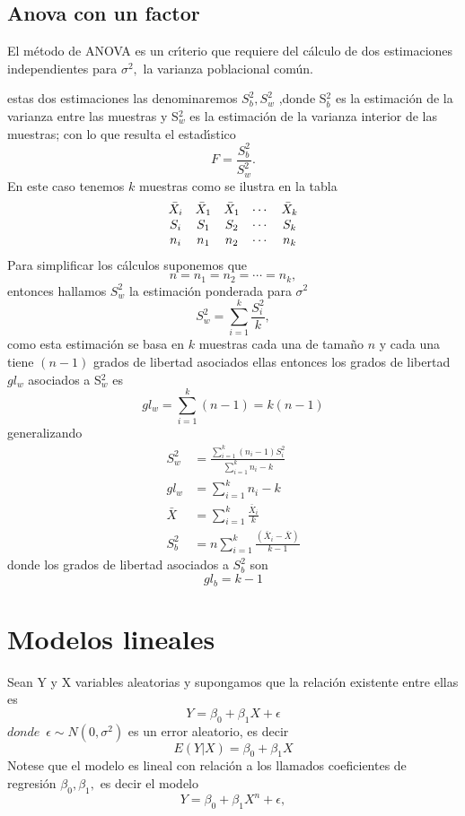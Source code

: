 \subsection{Anova con un factor}

El m\'{e}todo de ANOVA es un cr\'{\i}terio que requiere del c\'{a}lculo de dos
estimaciones independientes para $\sigma^{2},$ la varianza poblacional com\'{u}n.

estas dos estimaciones las denominaremos $S_{b}^{2},S_{w}^{2}$ ,donde
S$_{b}^{2}$ es la estimaci\'{o}n de la varianza entre las muestras y
S$_{w}^{2} $ es la estimaci\'{o}n de la varianza interior de las muestras; con
lo que resulta el estad\'{\i}stico
\[
F=\frac{S_{b}^{2}}{S_{w}^{2}}.
\]
En este caso tenemos $k$ muestras como se ilustra en la tabla
\[%
\begin{array}
[c]{ccccc}%
\bar{X}_{i} & \bar{X}_{1} & \bar{X}_{1} & \cdots & \bar{X}_{k}\\
S_{i} & S_{1} & S_{2} & \cdots & S_{k}\\
n_{i} & n_{1} & n_{2} & \cdots & n_{k}%
\end{array}
\]
Para simplificar los c\'{a}lculos suponemos que
\[
n=n_{1}=n_{2}=\cdots=n_{k},
\]
entonces hallamos $S_{w}^{2}$ la estimaci\'{o}n ponderada para $\sigma^{2}$%
\[
S_{w}^{2}=\sum_{i=1}^{k}\frac{S_{i}^{2}}{k},
\]
como esta estimaci\'{o}n se basa en $k$ muestras cada una de tama\~{n}o $n$ y
cada una tiene $\left(  n-1\right)  $ grados de libertad asociados ellas
entonces los grados de libertad $gl_{w}$ asociados a S$_{w}^{2}$ es
\[
gl_{w}=\sum_{i=1}^{k}\left(  n-1\right)  =k\left(  n-1\right)
\]
generalizando
\begin{align*}
S_{w}^{2}  &  =\frac{\sum_{i=1}^{k}\left(  n_{i}-1\right)  S_{i}^{2}}%
{\sum_{i=1}^{k}n_{i}-k}\\
gl_{w}  &  =\sum_{i=1}^{k}n_{i}-k\\
\bar{X}  &  =\sum_{i=1}^{k}\frac{\bar{X}_{i}}{k}\\
S_{b}^{2}  &  =n\sum_{i=1}^{k}\frac{\left(  \bar{X}_{i}-\bar{X}\right)  }{k-1}%
\end{align*}
donde los grados de libertad asociados a $S_{b}^{2}$ son
\[
gl_{b}=k-1
\]

\section{Modelos lineales}%

\begin{definition}
Sean Y y X variables aleatorias y supongamos que la relaci\'{o}n existente
entre ellas es
\begin{equation}
Y=\beta_0+\beta_1X+\epsilon%
\end{equation}
$donde\;\ \epsilon\sim N\left(   0,\sigma^{2}\right)   $ es un error
aleatorio, es decir
\begin{equation}
E\left(   Y|X\right)   =\beta_0+\beta_1X
\end{equation}
Notese que el modelo es lineal con relaci\'{o}n a los llamados coeficientes de
regresi\'{o}n $\beta_{0},\beta_{1},$ es decir el modelo
\begin{equation}
Y=\beta_0+\beta_1X^n+\epsilon,
\end{equation}
\end{definition} 

